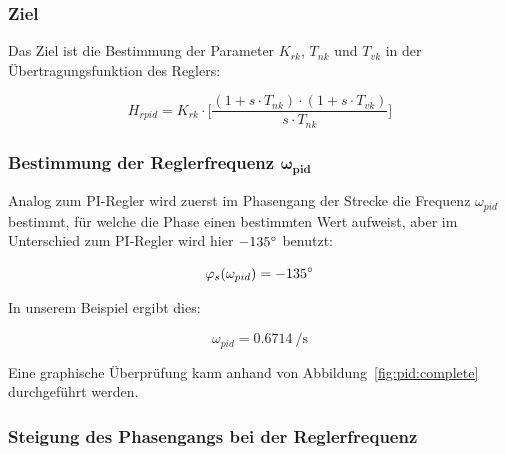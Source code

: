 \subsubsection*{Ziel}
Das Ziel ist  die Bestimmung der Parameter $K_{rk}$, $T_{nk}$  und $T_{vk}$ in
der \"Ubertragungsfunktion des Reglers:

\begin{equation} \label{eq:pid:target}
    H_{rpid} = K_{rk} \cdot \biggl[ \frac{(1 + s \cdot T_{nk}) \cdot (1 + s \cdot T_{vk}) }{ s \cdot T_{nk} } \biggr]
\end{equation}


\subsubsection{Bestimmung der Reglerfrequenz $\mathbf{\boldsymbol{\omega}_{pid}}$}

Analog  zum PI-Regler  wird  zuerst  im Phasengang  der  Strecke die  Frequenz
$\omega_{pid}$  bestimmt,  f\"ur  welche   die  Phase  einen  bestimmten  Wert
aufweist,  aber   im  Unterschied   zum  PI-Regler  wird   hier  $-135\degree$
benutzt\footnotemark[7]:

\begin{equation} \label{eq:pid:phi_s}
    \varphi_s(\omega_{pid}) = -135 \degree
\end{equation}


In unserem Beispiel ergibt dies:

\begin{equation} \label{eq:pid:omega_pid}
    \omega_{pid} = \SI{0.6714}{\per\second}
\end{equation}

Eine       graphische       \"Uberpr\"ufung        kann       anhand       von
Abbildung~\ref{fig:pid:complete} durchgef\"uhrt werden.


\subsubsection{Steigung des Phasengangs bei der Reglerfrequenz}

